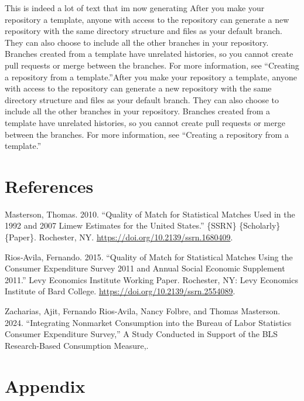 \documentclass[
  12pt,
]{article}
\newlength{\cslhangindent}
\newenvironment{CSLReferences}[2] %
 {\begin{list}{}{%
  \setlength{\itemindent}{0pt}
  \setlength{\leftmargin}{0pt}
  \setlength{\parsep}{1em}
  \ifodd #1
   \setlength{\leftmargin}{\cslhangindent}
   \setlength{\itemindent}{-1\cslhangindent}
  \fi
  \setlength{\itemsep}{#2\baselineskip}}}
 {\end{list}}
\begin{document}
This is indeed a lot of text that im now generating After you make your
repository a template, anyone with access to the repository can generate
a new repository with the same directory structure and files as your
default branch. They can also choose to include all the other branches
in your repository. Branches created from a template have unrelated
histories, so you cannot create pull requests or merge between the
branches. For more information, see ``Creating a repository from a
template.''After you make your repository a template, anyone with access
to the repository can generate a new repository with the same directory
structure and files as your default branch. They can also choose to
include all the other branches in your repository. Branches created from
a template have unrelated histories, so you cannot create pull requests
or merge between the branches. For more information, see ``Creating a
repository from a template.''

\section{References}\label{references}

\singlespacing

\label{refs}
\begin{CSLReferences}{1}{0}
Masterson, Thomas. 2010. {``Quality of {Match} for {Statistical}
{Matches} {Used} in the 1992 and 2007 {Limew} {Estimates} for the
{United} {States}.''} \{SSRN\} \{Scholarly\} \{Paper\}. Rochester, NY.
\url{https://doi.org/10.2139/ssrn.1680409}.

Rios‐Avila, Fernando. 2015. {``Quality of {Match} for {Statistical}
{Matches} {Using} the {Consumer} {Expenditure} {Survey} 2011 and
{Annual} {Social} {Economic} {Supplement} 2011.''} Levy Economics
Institute Working Paper. Rochester, NY: Levy Economics Institute of Bard
College. \url{https://doi.org/10.2139/ssrn.2554089}.

Zacharias, Ajit, Fernando Rios-Avila, Nancy Folbre, and Thomas
Masterson. 2024. {``Integrating {Nonmarket} {Consumption} into the
{Bureau} of {Labor} {Statistics} {Consumer} {Expenditure} {Survey},''} A
{Study} {Conducted} in {Support} of the {BLS} {Research}-{Based}
{Consumption} {Measure},.

\end{CSLReferences}

\onehalfspacing

\section{Appendix}\label{appendix}

\lipsum[1-2]
\end{document}
